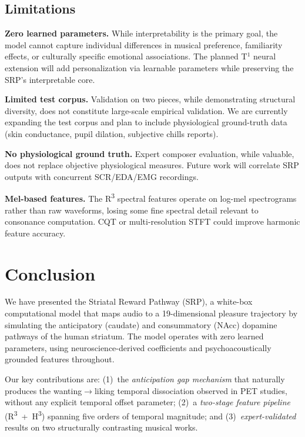 \documentclass[10pt,twocolumn]{article}
\newcommand{\Rtri}{R\textsuperscript{3}}
\newcommand{\Htri}{H\textsuperscript{3}}
\begin{document}
\subsection{Limitations}

\textbf{Zero learned parameters.} While interpretability is the primary goal, the model cannot capture individual differences in musical preference, familiarity effects, or culturally specific emotional associations. The planned T$^1$ neural extension will add personalization via learnable parameters while preserving the SRP's interpretable core.

\textbf{Limited test corpus.} Validation on two pieces, while demonstrating structural diversity, does not constitute large-scale empirical validation. We are currently expanding the test corpus and plan to include physiological ground-truth data (skin conductance, pupil dilation, subjective chills reports).

\textbf{No physiological ground truth.} Expert composer evaluation, while valuable, does not replace objective physiological measures. Future work will correlate SRP outputs with concurrent SCR/EDA/EMG recordings.

\textbf{Mel-based features.} The \Rtri{} spectral features operate on log-mel spectrograms rather than raw waveforms, losing some fine spectral detail relevant to consonance computation. CQT or multi-resolution STFT could improve harmonic feature accuracy.


\section{Conclusion}
\label{sec:conclusion}

We have presented the Striatal Reward Pathway (SRP), a white-box computational model that maps audio to a 19-dimensional pleasure trajectory by simulating the anticipatory (caudate) and consummatory (NAcc) dopamine pathways of the human striatum. The model operates with zero learned parameters, using neuroscience-derived coefficients and psychoacoustically grounded features throughout.

Our key contributions are: (1)~the \textit{anticipation gap mechanism} that naturally produces the wanting$\to$liking temporal dissociation observed in PET studies, without any explicit temporal offset parameter; (2)~a \textit{two-stage feature pipeline} (\Rtri{}~+~\Htri{}) spanning five orders of temporal magnitude; and (3)~\textit{expert-validated} results on two structurally contrasting musical works.
\end{document}
